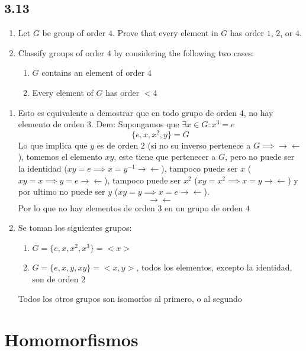 \documentclass[11pt]{article}
\begin{document}
\subsection*{3.13}
\begin{enumerate}[label=(\alph*)]
	\item Let $G$ be group of order $4$. Prove that every element in $G$ has order $1$, $2$, or $4$.
	
	\item Classify groups of order $4$ by considering the following two cases:
	\begin{enumerate}[label=(\roman*)]
		\item $G$ contains an element of order $4$
		
		\item Every element of $G$ has order $<4$
	\end{enumerate}
	
\end{enumerate}
\begin{enumerate}[label=(\alph*)]
	\item Esto es equivalente a demostrar que en todo grupo de orden $4$, no hay elemento de orden $3$.
	Dem: Supongamos que $\exists x\in G:x^3=e$
	\[
	\{e,x,x^2,y\}=G
	\]
	Lo que implica que $y$ es de orden $2$ (si no su inverso pertenece a $G\implies \rightarrow\leftarrow$), tomemos el elemento $xy$, este tiene que pertenecer a $G$, pero no puede ser la identidad ($xy=e\implies x=y^{-1}\rightarrow\leftarrow$), tampoco puede ser $x$ ($xy=x\implies y=e\rightarrow\leftarrow$), tampoco puede ser $x^2$ ($xy=x^2\implies x=y\rightarrow\leftarrow$) y por ultimo no puede ser $y$ ($xy=y\implies x=e\rightarrow\leftarrow$).
	\[
	\rightarrow\leftarrow
	\]
	Por lo que no hay elementos de orden $3$ en un grupo de orden $4$
	
	\item Se toman los siguientes grupos:
	\begin{enumerate}[label=(\roman*)]
		\item $G=\{e,x,x^2,x^3\}=<x>$
		
		\item $G=\{e,x,y,xy\}=<x,y>$, todos los elementos, excepto la identidad, son de orden $2$
	\end{enumerate}
	Todos los otros grupos son isomorfos al primero, o al segundo
	
\end{enumerate}

\section{Homomorfismos}
\end{document}
